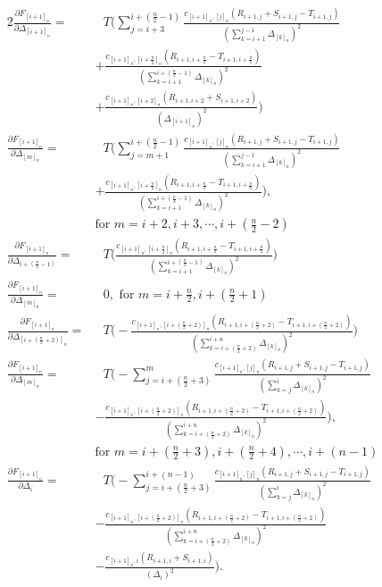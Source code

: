 \begin{alignat}{2}
\frac{\partial F_{[i+1]_n}}{\partial\Delta_{[i+1]_n}} =& \text{ }T \Bigg( \sum_{j= i+3}^{i+(\frac{n}{2}-1)}  \frac{c_{[i+1]_n,[j]_n}(R_{i+1,j} + S_{i+1,j} - T_{i+1,j})}{(\sum_{k=i+1}^{j-1}\Delta_{[k]_n})^2} \nonumber \\
  &+ \frac{c_{[i+1]_n,[i+\frac{n}{2}]_n}(R_{i+1,i+\frac{n}{2}} - T_{i+1,i+\frac{n}{2}})}{(\sum_{k=i+1}^{i+(\frac{n}{2}-1)}\Delta_{[k]_n})^2} \nonumber \\
  &+ \frac{c_{[i+1]_n,[i+2]_n}(R_{i+1,i+2} + S_{i+1,i+2})}{(\Delta_{[i+1]_n})^2} \Bigg) \nonumber \\
\frac{\partial F_{[i+1]_n}}{\partial\Delta_{[m]_n}} =& \text{ }T \Bigg( \sum_{j= m + 1}^{i+(\frac{n}{2}-1)}  \frac{c_{[i+1]_n,[j]_n}(R_{i+1,j} + S_{i+1,j} - T_{i+1,j})}{(\sum_{k=i+1}^{j-1}\Delta_{[k]_n})^2} \nonumber \\
  &+ \frac{c_{[i+1]_n,[i+\frac{n}{2}]_n}(R_{i+1,i+\frac{n}{2}} - T_{i+1,i+\frac{n}{2}})}{(\sum_{k=i+1}^{i+(\frac{n}{2}-1)}\Delta_{[k]_n})^2} \Bigg), \nonumber \\
 &\text{for } m = i+2, i+3, \cdots, i+ (\frac{n}{2} - 2) \nonumber \\
\frac{\partial F_{[i+1]_n}}{\partial\Delta_{i+(\frac{n}{2}-1)}} =& \text{ } T \Bigg( \frac{c_{[i+1]_n,[i+\frac{n}{2}]_n}(R_{i+1,i+\frac{n}{2}} - T_{i+1,i+\frac{n}{2}})}{(\sum_{k=i+1}^{i+(\frac{n}{2}-1)}\Delta_{[k]_n})^2} \Bigg) \nonumber \ \\
\frac{\partial F_{[i+1]_n}}{\partial\Delta_[m]_n} =& \text{ }0, \text{ for } m = i+ \frac{n}{2}, i+( \frac{n}{2} + 1) \nonumber \\
\frac{\partial F_{[i+1]_n}}{\partial\Delta_{[i+(\frac{n}{2}+2)]_n}} =& \text{ } T \Bigg( - \frac{c_{[i+1]_n,[i+(\frac{n}{2}+2)]_n}(R_{i+1,i+(\frac{n}{2}+2)} - T_{i+1,i+(\frac{n}{2}+2)})}{(\sum_{k=i+(\frac{n}{2}+2)}^{i+n}\Delta_{[k]_n})^2} \Bigg) \nonumber \\
\frac{\partial F_{[i+1]_n}}{\partial\Delta_{[m]_n}} =& \text{ }T \Bigg(- \sum_{j= i+ (\frac{n}{2}+3)}^{m}  \frac{c_{[i+1]_n,[j]_n}(R_{i+1,j} + S_{i+1,j} - T_{i+1,j})}{(\sum_{k=j}^{i}\Delta_{[k]_n})^2} \nonumber \\
&- \frac{c_{[i+1]_n,[i+(\frac{n}{2}+2)]_n}(R_{i+1,i+(\frac{n}{2}+2)} - T_{i+1,i+(\frac{n}{2}+2)})}{(\sum_{k=i+(\frac{n}{2}+2)}^{i+n}\Delta_{[k]_n})^2} \Bigg), \nonumber \\
&\text{for } m = i+(\frac{n}{2}+3), i+(\frac{n}{2}+4), \cdots, i+ (n-1) \nonumber \\
\frac{\partial F_{[i+1]_n}}{\partial\Delta_{i}} =& \text{ }T \Bigg(- \sum_{j= i + (\frac{n}{2}+ 3)}^{i+(n-1)}  \frac{c_{[i+1]_n,[j]_n}(R_{i+1,j} + S_{i+1,j} - T_{i+1,j})}{(\sum_{k=j}^{i}\Delta_{[k]_n})^2} \nonumber \\
 &- \frac{c_{[i+1]_n,[i+(\frac{n}{2}+2)]_n}(R_{i+1,i+(\frac{n}{2}+2)} - T_{i+1,i+(\frac{n}{2}+2)})}{(\sum_{k=i+(\frac{n}{2}+2)}^{i+n}\Delta_{[k]_n})^2} \nonumber \\
 &- \frac{c_{[i+1]_n,i}(R_{i+1,i} + S_{i+1,i})}{(\Delta_{i})^2} \Bigg).
\label{eq:difffiplus1}
\end{alignat}


